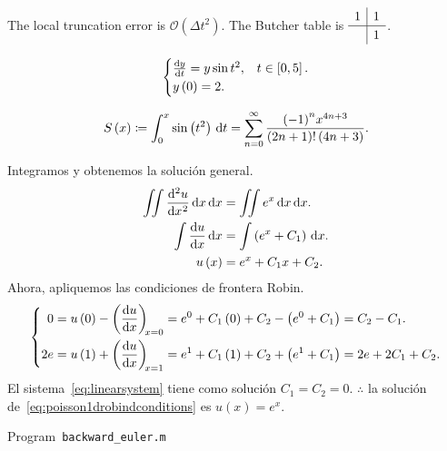 The local truncation error is
\begin{math}
	\mathcal{O}
	\left(\Delta t^{2}\right)
\end{math}.
The Butcher table is
\begin{math}
	\renewcommand\arraystretch{1.2}
	\begin{array}
		{c|c}
		1 & 1 \\
		\hline
		  & 1
	\end{array}
\end{math}.

\begin{equation*}
	\begin{cases}
		\diff{y}{t}=
		y\sin t^{2},       & t\in\left[0,5\right]. \\
		y\left(0\right)=2. &
	\end{cases}
\end{equation*}

\begin{equation*}
	S\left(x\right)\coloneqq
	\int_{0}^{x}\sin\left(t^{2}\right)\dl t=
	\sum_{n=0}^{\infty}
	\frac{{\left(-1\right)}^{n}x^{4n+3}}{\left(2n+1\right)!\left(4n+3\right)}.
\end{equation*}

Integramos y obtenemos la solución general.
\begin{align*}
	\iint
	\diff[2]{u}{x}
	\dl x
	\dl x           & =
	\iint
	e^{x}
	\dl x
	\dl x.              \\
	\int
	\diff{u}{x}
	\dl x           & =
	\int
	\left(e^{x}+C_{1}\right)
	\dl x.              \\
	u\left(x\right) & =
	e^{x}+C_{1}x+C_{2}.
\end{align*}
Ahora, apliquemos las condiciones de frontera Robin.
\begin{equation}\label{eq:linearsystem}
	\left\{
	\begin{aligned}
		0
		 & =
		u\left(0\right)-
		\diff{u}{x}[x=0]=
		e^{0}+C_{1}\left(0\right)+C_{2}-
		\left(e^{0}+C_{1}\right)=
		C_{2}-C_{1}. \\
		2e
		 & =
		u\left(1\right)+
		\diff{u}{x}[x=1]=
		e^{1}+C_{1}\left(1\right)+C_{2}+
		\left(e^{1}+C_{1}\right)=
		2e+2C_{1}+C_{2}.
	\end{aligned}
	\right.
\end{equation}
El sistema~\eqref{eq:linearsystem} tiene como solución
$C_{1}=C_{2}=0$.
$\therefore$ la solución
de~\eqref{eq:poisson1drobindconditions} es
$u\left(x\right)=e^{x}$.

\begin{listing}[ht!]
	\tiny
	\centering
	\caption{Program~\texttt{backward\_euler.m}}
	\label{code:backward_euler.m}
\end{listing}

